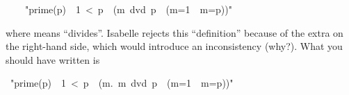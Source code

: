 \begin{isabelle}%
\isanewline
\ \ \ \ {"}prime(p)\ {\isasymequiv}\ 1\ <\ p\ {\isasymand}\ (m\ dvd\ p\ {\isasymlongrightarrow}\ (m=1\ {\isasymor}\ m=p)){"}%
\begin{isamarkuptext}%
\noindent\small
where  means ``divides''.
Isabelle rejects this ``definition'' because of the extra  on the
right-hand side, which would introduce an inconsistency (why?). What you
should have written is%
\end{isamarkuptext}%
\ {"}prime(p)\ {\isasymequiv}\ 1\ <\ p\ {\isasymand}\ ({\isasymforall}m.\ m\ dvd\ p\ {\isasymlongrightarrow}\ (m=1\ {\isasymor}\ m=p)){"}\end{isabelle}%
